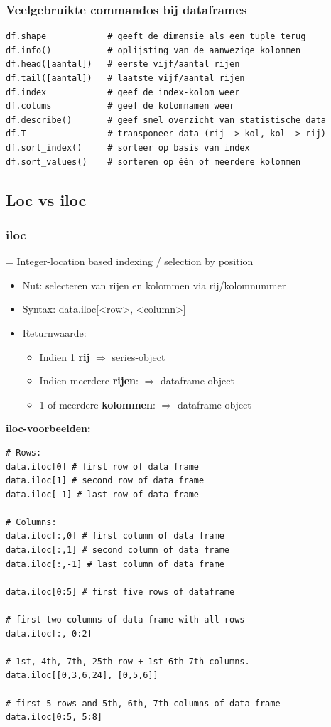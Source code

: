 \documentclass{article}
\begin{document}
\subsubsection{Veelgebruikte commandos bij dataframes}

\begin{verbatim}
df.shape            # geeft de dimensie als een tuple terug
df.info()           # oplijsting van de aanwezige kolommen
df.head([aantal])   # eerste vijf/aantal rijen
df.tail([aantal])   # laatste vijf/aantal rijen
df.index            # geef de index-kolom weer
df.colums           # geef de kolomnamen weer
df.describe()       # geef snel overzicht van statistische data
df.T                # transponeer data (rij -> kol, kol -> rij)
df.sort_index()     # sorteer op basis van index
df.sort_values()    # sorteren op één of meerdere kolommen
\end{verbatim}


\subsection{Loc vs iloc}

\subsubsection{iloc}

= Integer-location based indexing / selection by position

\begin{itemize}
    \item Nut: selecteren van rijen en kolommen via rij/kolomnummer
    \item Syntax: data.iloc[<row>, <column>]
    \item Returnwaarde:
    \begin{itemize}
        \item Indien 1 \textbf{rij} $\Rightarrow$ series-object
        \item Indien meerdere \textbf{rijen}: $\Rightarrow$ dataframe-object
        \item 1 of meerdere \textbf{kolommen}: $\Rightarrow$ dataframe-object 
    \end{itemize}
\end{itemize}

\textbf{iloc-voorbeelden:}

\begin{verbatim}
# Rows:
data.iloc[0] # first row of data frame
data.iloc[1] # second row of data frame
data.iloc[-1] # last row of data frame

# Columns:
data.iloc[:,0] # first column of data frame
data.iloc[:,1] # second column of data frame
data.iloc[:,-1] # last column of data frame

data.iloc[0:5] # first five rows of dataframe

# first two columns of data frame with all rows
data.iloc[:, 0:2] 

# 1st, 4th, 7th, 25th row + 1st 6th 7th columns.
data.iloc[[0,3,6,24], [0,5,6]]  

# first 5 rows and 5th, 6th, 7th columns of data frame
data.iloc[0:5, 5:8]

\end{verbatim}
\end{document}
